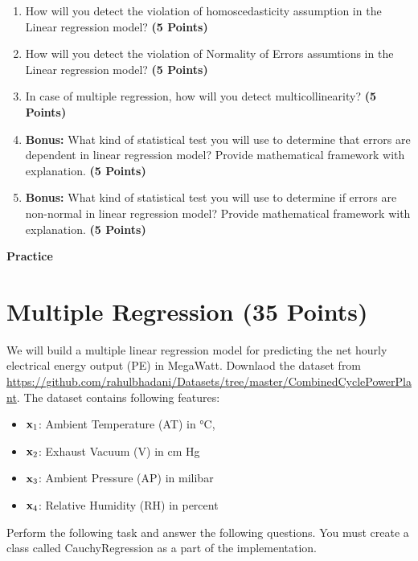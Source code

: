 \documentclass[12pt, xcolor=dvipsnames,svgnames,x11names]{article}
\begin{document}
\begin{enumerate}
\item How will you detect the violation of homoscedasticity assumption in the Linear regression model? \hfill \textbf{(5 Points)}

\item How will you detect the violation of Normality of Errors assumtions in the Linear regression model? \hfill \textbf{(5 Points)}

\item In case of multiple regression, how will you detect multicollinearity? \hfill \textbf{(5 Points)}

\item \textbf{Bonus:} What kind of statistical test you will use to determine that errors are dependent in linear regression model? Provide mathematical framework with explanation. \hfill \textbf{(5 Points)}

\item \textbf{Bonus:} What kind of statistical test you will use to determine if errors are non-normal in linear regression model? Provide mathematical framework with explanation. \hfill \textbf{(5 Points)}

\end{enumerate}

{{\LARGE \textbf{Practice}}}

\section{Multiple Regression (35 Points)}

We will build a multiple linear regression model for predicting the net hourly electrical energy output (PE) in MegaWatt. Downlaod the dataset from \url{https://github.com/rahulbhadani/Datasets/tree/master/CombinedCyclePowerPlant}. The dataset contains following features:

\begin{itemize}
    \item ${\mathbf x}_1$: Ambient Temperature (AT) in °C, 
    \item ${\mathbf x}_2$: Exhaust Vacuum (V) in cm Hg 
    \item ${\mathbf x}_3$: Ambient Pressure (AP) in milibar
    \item ${\mathbf x}_4$: Relative Humidity (RH) in percent
\end{itemize}

Perform the following task and answer the following questions. You must create a class called CauchyRegression as a part of the implementation.
\end{document}
